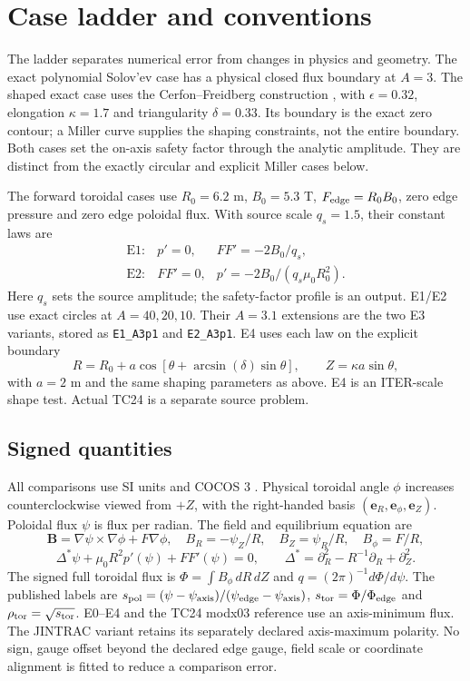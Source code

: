 \documentclass[10pt,a4paper]{article}
\newcommand{\pageheading}[1]{\clearpage\section{#1}}
\begin{document}
\pageheading{Case ladder and conventions}
The ladder separates numerical error from changes in physics and geometry.
The exact polynomial Solov'ev case has a physical closed flux boundary at
$A=3$. The shaped exact case uses the Cerfon--Freidberg construction
\cite{cerfon}, with $\epsilon=0.32$, elongation $\kappa=1.7$ and triangularity
$\delta=0.33$. Its boundary is the exact zero contour; a Miller curve supplies
the shaping constraints, not the entire boundary. Both cases set the on-axis
safety factor through the analytic amplitude. They are distinct from the
exactly circular and explicit Miller cases below.

The forward toroidal cases use $R_0=6.2$ m, $B_0=5.3$ T,
$F_{\rm edge}=R_0B_0$, zero edge pressure and zero edge poloidal flux.
With source scale $q_s=1.5$, their constant laws are
\[
\begin{array}{lll}
\mathrm{E1}: & p'=0,& FF'=-2B_0/q_s,\\
\mathrm{E2}: & FF'=0,&p'=-2B_0/(q_s\mu_0R_0^2).
\end{array}
\]
Here $q_s$ sets the source amplitude; the safety-factor profile is an output.
E1/E2 use exact circles at $A=40,20,10$. Their $A=3.1$ extensions are the two
E3 variants, stored as \texttt{E1\_A3p1} and \texttt{E2\_A3p1}.
E4 uses each law on the explicit boundary
\[
R=R_0+a\cos[\theta+\arcsin(\delta)\sin\theta],\qquad
Z=\kappa a\sin\theta,
\]
with $a=2$ m and the same shaping parameters as above. E4 is an ITER-scale
shape test. Actual TC24 is a separate source problem.

\subsection*{Signed quantities}
All comparisons use SI units and COCOS 3 \cite{cocos}. Physical toroidal angle
$\phi$ increases counterclockwise viewed from $+Z$, with the right-handed
basis $(\mathbf e_R,\mathbf e_\phi,\mathbf e_Z)$. Poloidal flux $\psi$ is
flux per radian. The field and equilibrium equation are
\[
\mathbf B=\nabla\psi\mathbin{\times}\nabla\phi+F\nabla\phi,
\quad B_R=-\psi_Z/R,\quad B_Z=\psi_R/R,\quad B_\phi=F/R,
\]
\[
\Delta^*\psi+\mu_0R^2p'(\psi)+FF'(\psi)=0,\qquad
\Delta^*=\partial_R^2-R^{-1}\partial_R+\partial_Z^2.
\]
The signed full toroidal flux is $\Phi=\int B_\phi\,dR\,dZ$ and
$q=(2\pi)^{-1}d\Phi/d\psi$. The published labels are
$s_{\rm pol}=(\psi-\psi_{\rm axis})/(\psi_{\rm edge}-\psi_{\rm axis})$,
$s_{\rm tor}=\Phi/\Phi_{\rm edge}$ and $\rho_{\rm tor}=\sqrt{s_{\rm tor}}$.
E0--E4 and the TC24 modx03 reference use an axis-minimum flux. The
JINTRAC variant retains its separately declared axis-maximum polarity. No sign, gauge offset beyond the declared edge gauge, field scale or
coordinate alignment is fitted to reduce a comparison error.
\end{document}
